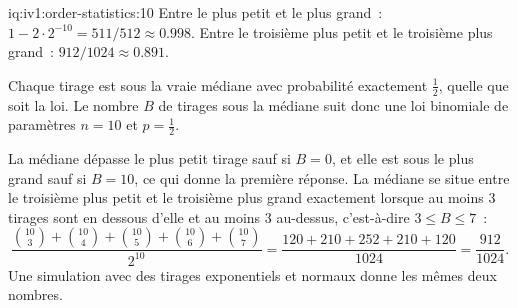\begin{solution}{iq:iv1:order-statistics:10}
Entre le plus petit et le plus grand~: $1 - 2 \cdot 2^{-10} = 511/512 \approx 0.998$. Entre le troisième plus petit et le troisième plus grand~: $912/1024 \approx 0.891$.

Chaque tirage est sous la vraie médiane avec probabilité exactement $\tfrac12$, quelle que soit la loi. Le nombre $B$ de tirages sous la médiane suit donc une loi binomiale de paramètres $n = 10$ et $p = \tfrac12$.

La médiane dépasse le plus petit tirage sauf si $B = 0$, et elle est sous le plus grand sauf si $B = 10$, ce qui donne la première réponse. La médiane se situe entre le troisième plus petit et le troisième plus grand exactement lorsque au moins 3 tirages sont en dessous d'elle et au moins 3 au-dessus, c'est-à-dire $3 \le B \le 7$~:
\[
\frac{\binom{10}{3} + \binom{10}{4} + \binom{10}{5} + \binom{10}{6} + \binom{10}{7}}{2^{10}} = \frac{120 + 210 + 252 + 210 + 120}{1024} = \frac{912}{1024}.
\]
Une simulation avec des tirages exponentiels et normaux donne les mêmes deux nombres.

\end{solution}

